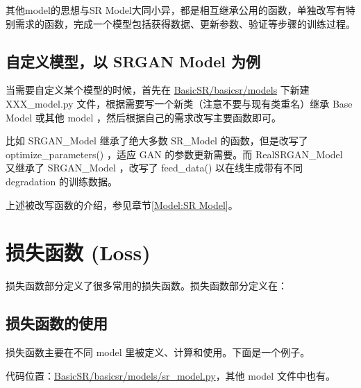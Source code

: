 \documentclass[../main.tex]{subfiles}
\begin{document}
其他model的思想与SR Model大同小异，都是相互继承公用的函数，单独改写有特别需求的函数，完成一个模型包括获得数据、更新参数、验证等步骤的训练过程。


\subsection{自定义模型，以 SRGAN Model 为例}

当需要自定义某个模型的时候，首先在 \href{https://github.com/XPixelGroup/BasicSR/blob/master/basicsr/models}{BasicSR/basicsr/models} 下新建 XXX\_model.py 文件，根据需要写一个新类（注意不要与现有类重名）继承 Base Model 或其他 model ，然后根据自己的需求改写主要函数即可。

比如 SRGAN\_Model 继承了绝大多数 SR\_Model 的函数，但是改写了 optimize\_parameters() ，适应 GAN 的参数更新需要。而 RealSRGAN\_Model 又继承了 SRGAN\_Model ，改写了 feed\_data() 以在线生成带有不同 degradation 的训练数据。

\begin{note} %
    上述被改写函数的介绍，参见章节\ref{Model:SR Model}。
\end{note}


\section{损失函数 (Loss)}\label{code_structure:loss}

损失函数部分定义了很多常用的损失函数。损失函数部分定义在：
\subsection{损失函数的使用}

损失函数主要在不同 model 里被定义、计算和使用。下面是一个例子。

代码位置：\href{https://github.com/XPixelGroup/BasicSR/blob/master/basicsr/models/sr_model.py}{BasicSR/basicsr/models/sr\_model.py}，其他 model 文件中也有。
\end{document}

